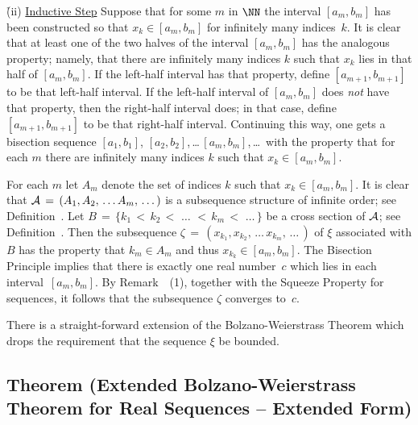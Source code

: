         \h (ii) \underline{Inductive Step} Suppose that for some $m$ in ${\NN}$ the interval $[a_{m},b_{m}]$
    has been constructed so that $x_{k}{\in}[a_{m},b_{m}]$ for infinitely many indices~$k$.
    It is clear that at least one of the two halves of the interval $[a_{m},b_{m}]$ has the analogous property;
    namely, that there are infinitely many indices $k$ such that $x_{k}$ lies in that half of $[a_{m},b_{m}]$.
    If the left-half interval has that property, define $[a_{m+1},b_{m+1}]$ to be that left-half interval.
    If the left-half interval of $[a_{m},b_{m}]$ does {\em not} have that property,
    then the right-half interval does; in that case, define $[a_{m+1},b_{m+1}]$ to be that right-half interval.
    Continuing this way, one gets a bisection sequence $[a_{1},b_{1}]$, $[a_{2},b_{2}]$,\,{\ldots}\,$[a_{m},b_{m}]$,\,{\ldots}\,
    with the property that for each $m$ there are infinitely many indices $k$ such that $x_{k}{\in}[a_{m},b_{m}]$.

        For each $m$ let $A_{m}$ denote the set of indices $k$ such that $x_{k}{\in}[a_{m},b_{m}]$. It is clear that
    ${\cal A} \,=\, (A_{1},A_{2},\,{\ldots}\,A_{m},\,{\ldots}\,)$ is a subsequence structure of infinite order; see Definition~.
    Let $B \,=\, \{k_{1}\,<\,k_{2}\,<\,\,{\ldots}\,\,<\,k_{m}\,<\,\,{\ldots}\,\}$ be a cross section of ${\cal A}$; see Definition~.
    Then the subsequence ${\zeta} \,=\, (x_{k_{1}},x_{k_{2}},\,{\ldots}\,x_{k_{m}},\,{\ldots}\,)$
    of ${\xi}$ associated with $B$ has the property that $k_{m}{\in}A_{m}$ and thus $x_{k_{k}}{\in}[a_{m},b_{m}]$.
    The Bisection Principle implies that there is exactly one real number~$c$ which lies in each interval~$[a_{m},b_{m}]$.
    By Remark~~(1), together with the Squeeze Property for sequences, it follows that the subsequence ${\zeta}$ converges to~$c$.

\VV

        There is a straight-forward extension of the Bolzano-Weierstrass Theorem which drops the requirement that the sequence ${\xi}$ be bounded.

\V

            \subsection{\small{\bf Theorem} (Extended Bolzano-Weierstrass Theorem for Real Sequences -- Extended Form)}
            \label{ThmC40.60}


